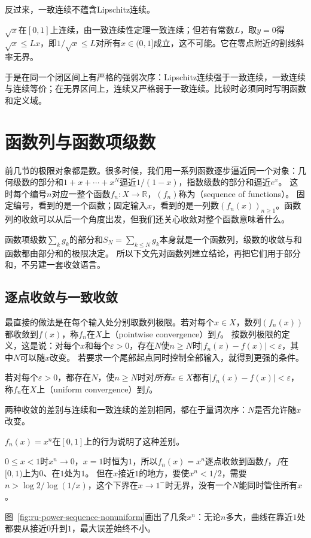反过来，一致连续不蕴含Lipschitz连续。
\begin{example}[一致连续而非Lipschitz连续]
\label{ex:ru-sqrt-not-lipschitz}
$\sqrt x$在$[0,1]$上连续，由一致连续性定理一致连续；但若有常数$L$，取$y=0$得$\sqrt x\leq Lx$，即$1/\sqrt x\leq L$对所有$x\in(0,1]$成立，这不可能。它在零点附近的割线斜率无界。
\end{example}

于是在同一个闭区间上有严格的强弱次序：Lipschitz连续强于一致连续，一致连续与连续等价；在无界区间上，连续又严格弱于一致连续。比较时必须同时写明函数和定义域。
\section{函数列与函数项级数}
\label{sec:ru-function-sequences}

前几节的极限对象都是数。很多时候，我们用一系列函数逐步逼近同一个对象：几何级数的部分和$1+x+\cdots+x^N$逼近$1/(1-x)$，指数级数的部分和逼近$e^x$。
这时每个编号$n$对应一整个函数$f_n:X\to\mathbb R$，$(f_n)$称为（sequence of functions）。
固定编号，看到的是一个函数；固定输入$x$，看到的是一列数$(f_n(x))_{n\geq1}$。函数列的收敛可以从后一个角度出发，但我们还关心收敛对整个函数意味着什么。

函数项级数$\sum_kg_k$的部分和$S_N=\sum_{k\leq N}g_k$本身就是一个函数列，级数的收敛与和函数都由部分和的极限决定。
所以下文先对函数列建立结论，再把它们用于部分和，不另建一套收敛语言。

\subsection{逐点收敛与一致收敛}
\label{sec:ru-pointwise-uniform}

最直接的做法是在每个输入处分别取数列极限。若对每个$x\in X$，数列$(f_n(x))$都收敛到$f(x)$，称$f_n$在$X$上（pointwise convergence）到$f$。
按数列极限的定义，这是说：对每个$x$和每个$\varepsilon>0$，存在$N$使$n\geq N$时$|f_n(x)-f(x)|<\varepsilon$，其中$N$可以随$x$改变。
若要求一个尾部起点同时控制全部输入，就得到更强的条件。
\begin{definition}[一致收敛]
\label{def:ru-uniform-convergence}
若对每个$\varepsilon>0$，都存在$N$，使$n\geq N$时对\emph{所有}$x\in X$都有$|f_n(x)-f(x)|<\varepsilon$，称$f_n$在$X$上（uniform convergence）到$f$。
\end{definition}
两种收敛的差别与连续和一致连续的差别相同，都在于量词次序：$N$是否允许随$x$改变。

$f_n(x)=x^n$在$[0,1]$上的行为说明了这种差别。
\begin{example}[{$x^n$在$[0,1]$上逐点收敛而不一致收敛}]
\label{ex:ru-power-sequence-nonuniform}
$0\leq x<1$时$x^n\to0$，$x=1$时恒为$1$，所以$f_n(x)=x^n$逐点收敛到函数$f$，$f$在$[0,1)$上为$0$、在$1$处为$1$。
但在$x$接近$1$的地方，要使$x^n<1/2$，需要$n>\log2/\log(1/x)$，这个下界在$x\to1^-$时无界，没有一个$N$能同时管住所有$x$。
\end{example}
图~\ref{fig:ru-power-sequence-nonuniform}画出了几条$x^n$：无论$n$多大，曲线在靠近$1$处都要从接近$0$升到$1$，最大误差始终不小。

